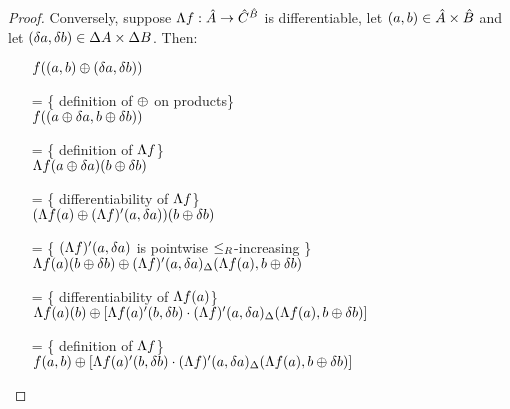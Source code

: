 \begin{proof}
  Conversely, suppose $\Lambda{f} : \hat{A} \rightarrow \hat{C}^{\hat{B}}$ is differentiable, let $(a, b) \in \hat{A} \times \hat{B}$
  and let $(\delta a, \delta b) \in \Delta A \times \Delta B$. Then:
  \begin{itemize}
    \item[ ]$f((a, b) \oplus (\delta a, \delta b))$
    \item[=]\{ definition of $\oplus$ on products\}\\
    $f((a \oplus \delta a, b \oplus \delta b))$
    \item[=]\{ definition of $\Lambda{f}$\}\\
    $\Lambda{f}(a \oplus \delta a)(b \oplus \delta b)$
    \item[=]\{ differentiability of $\Lambda{f}$\}\\
    $(\Lambda{f}(a) \oplus (\Lambda{f})'(a, \delta a))(b \oplus \delta b)$
    \item[=]\{ $(\Lambda{f})'(a, \delta a)$ is pointwise $\leq_R$-increasing \}\\
    $\Lambda{f}(a)(b \oplus \delta b) \oplus (\Lambda{f})'(a, \delta a)_\Delta(\Lambda{f}(a), b \oplus \delta b)$
    \item[=]\{ differentiability of $\Lambda{f}(a)$\}\\
    $\Lambda{f}(a)(b) \oplus [ \Lambda{f}(a)'(b, \delta b) \cdot (\Lambda{f})'(a, \delta a)_\Delta(\Lambda{f}(a), b \oplus \delta b) ]$
    \item[=]\{ definition of $\Lambda{f}$\}\\
    $f(a, b) \oplus [ \Lambda{f}(a)'(b, \delta b) \cdot (\Lambda{f})'(a, \delta a)_\Delta(\Lambda{f}(a), b \oplus \delta b) ]$
  \end{itemize}
\end{proof}
\fi

